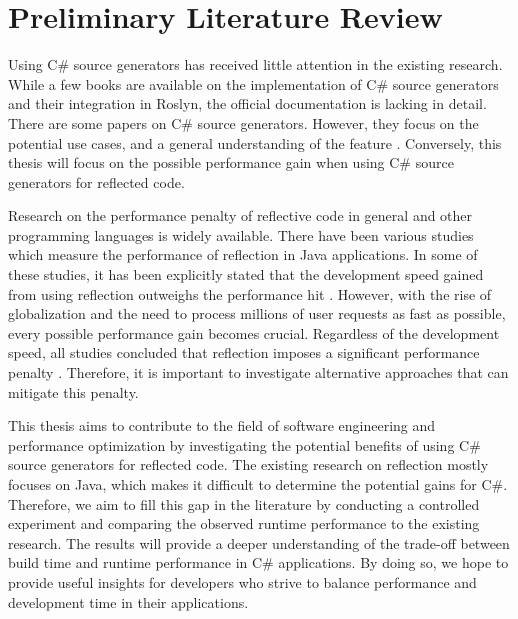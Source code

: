 \chapter{Preliminary Literature Review}

Using C\# source generators has received little attention in the existing research. While a few books \cite{Franz2022TrendsCompilerbau, Microsoft2022SourceGenerators, Vermeir2022.NETPlatform} are available on the implementation of C\# source generators and their integration in Roslyn, the official documentation \cite{Microsoft2022SourceGenerators} is lacking in detail. There are some papers on C\# source generators. However, they focus on the potential use cases, and a general understanding of the feature \cite{Slimak2022SourceSLIMAK}. Conversely, this thesis will focus on the possible performance gain when using C\# source generators for reflected code.

Research on the performance penalty of reflective code in general and other programming languages is widely available. There have been various studies \cite{Forman2005EvaluatingPerformance, Halloway2001ReflectionInformIT, JavaReflection2013} which measure the performance of reflection in Java applications. In some of these studies, it has been explicitly stated that the development speed gained from using reflection outweighs the performance hit \cite{Halloway2001ReflectionInformIT}. However, with the rise of globalization and the need to process millions of user requests as fast as possible, every possible performance gain becomes crucial. Regardless of the development speed, all studies concluded that reflection imposes a significant performance penalty \cite{Forman2005EvaluatingPerformance, Halloway2001ReflectionInformIT, JavaReflection2013}. Therefore, it is important to investigate alternative approaches that can mitigate this penalty.

This thesis aims to contribute to the field of software engineering and performance optimization by investigating the potential benefits of using C\# source generators for reflected code. The existing research on reflection \cite{Forman2005EvaluatingPerformance, Halloway2001ReflectionInformIT, JavaReflection2013} mostly focuses on Java, which makes it difficult to determine the potential gains for C\#. Therefore, we aim to fill this gap in the literature by conducting a controlled experiment and comparing the observed runtime performance to the existing research. The results will provide a deeper understanding of the trade-off between build time and runtime performance in C\# applications. By doing so, we hope to provide useful insights for developers who strive to balance performance and development time in their applications.
